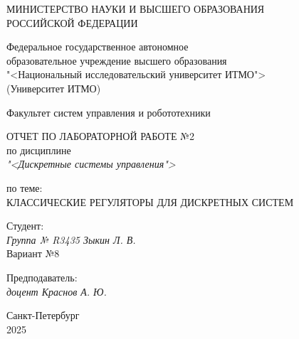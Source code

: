 \thispagestyle{empty}

\begin{center}
    МИНИСТЕРСТВО НАУКИ И ВЫСШЕГО ОБРАЗОВАНИЯ \\ РОССИЙСКОЙ ФЕДЕРАЦИИ

    \vspace{20pt}

    Федеральное государственное автономное \\ образовательное учреждение высшего образования \\
    "<Национальный исследовательский университет ИТМО"> \\
    (Университет ИТМО)

    \vspace{20pt}

    Факультет систем управления и робототехники
\end{center}

\vfill

\begin{center}
    ОТЧЕТ ПО ЛАБОРАТОРНОЙ РАБОТЕ №2\\  
    по дисциплине \\
    \textit{"<Дискретные системы управления">}

    \vspace{20pt}

    по теме: \\
    \uppercase{Классические регуляторы для дискретных систем}
\end{center}

\vfill

    \noindent Студент: \\
    \textit{Группа № R3435 \hfill Зыкин Л. В.} \\
    \noindent Вариант №8 \\
    \vspace{20pt}

    \noindent Предподаватель: \\
    \textit{доцент \hfill Краснов А. Ю.}

\vfill

\begin{center}
    Санкт-Петербург \\ 2025
\end{center}